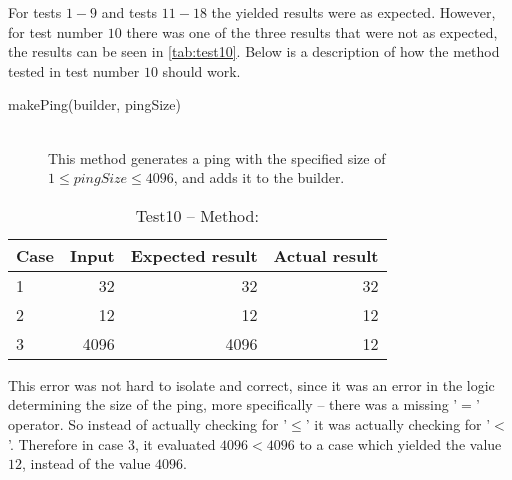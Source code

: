 For tests $1-9$ and tests $11-18$ the yielded results were as expected. However, for test number $10$ there was one of the three results that were not as expected, the results can be seen in \autoref{tab:test10}. 
Below is a description of how the method tested in test number $10$ should work.
\begin{description}
	\item[makePing(builder, pingSize)] \hfill \\
	This method generates a ping with the specified size of $1\leq pingSize \leq 4096$, and adds it to the builder.
\end{description}
\begin{table}[H]
	\centering
	\begin{tabular}{ l | r | r | r }
		Case & Input & Expected result & Actual result \\
		\hline
		1 & 32 & 32 & 32 \\
		\hline
		2 & 12 & 12 & 12 \\
		\hline
		3 & 4096 & 4096 & 12 \\
	\end{tabular}
	\caption{Test10 -- Method: }
	\label{tab:test10}
\end{table}
This error was not hard to isolate and correct, since it was an error in the logic determining the size of the ping, more specifically -- there was a missing '$=$' operator. So instead of actually checking for '$\leq$' it was actually checking for '$<$'. Therefore in case 3, it evaluated $4096<4096$ to a case which yielded the value $12$, instead of the value $4096$.